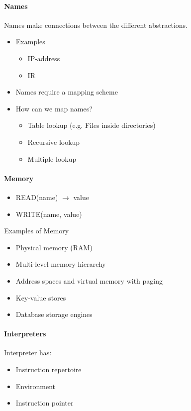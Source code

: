 \paragraph{Names}
Names make connections between the different abstractions.

\begin{itemize}
\item Examples
  \begin{itemize}
  \item IP-address
  \item IR
  \end{itemize}
\item Names require a mapping scheme
\item How can we map names?
  \begin{itemize}
  \item Table lookup (e.g. Files inside directories)
  \item Recursive lookup
  \item Multiple lookup
  \end{itemize}
\end{itemize}

\paragraph{Memory}
\begin{itemize}
\item READ(name) $\rightarrow$ value
\item WRITE(name, value)
\end{itemize}

Examples of Memory
\begin{itemize}
\item Physical memory (RAM)
\item Multi-level memory hierarchy
\item Address spaces and virtual memory with paging
\item Key-value stores
\item Database storage engines
\end{itemize}


\paragraph{Interpreters}
Interpreter has:
\begin{itemize}
\item Instruction repertoire
\item Environment
\item Instruction pointer
\end{itemize}

